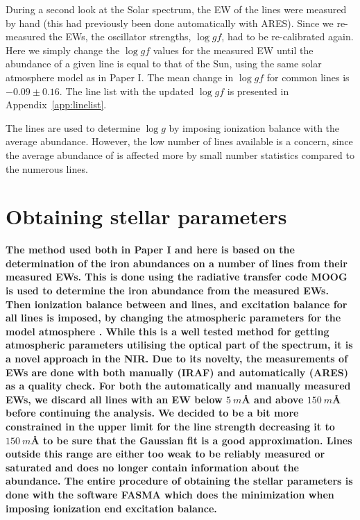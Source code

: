 \documentclass{aa}
\begin{document}
During a second look at the Solar spectrum, the EW of the lines were measured by
hand (this had previously been done automatically with ARES). Since we
re-measured the EWs, the oscillator strengths, $\log \mathit{gf}$, had to be
re-calibrated again. Here we simply change the $\log \mathit{gf}$ values for the
measured EW until the abundance of a given line is equal to that of the Sun,
using the same solar atmosphere model as in Paper I. The mean change in $\log
\mathit{gf}$ for common lines is $-0.09 \pm 0.16$. The line list with the
updated $\log \mathit{gf}$ is presented in Appendix~\ref{app:linelist}.

The  lines are used to determine $\log g$ by imposing ionization
balance with the average  abundance. However, the low number of
 lines available is a concern, since the average abundance of
 is affected more by small number statistics compared to the
numerous  lines.


\section{Obtaining stellar parameters}
\label{sec:method}

{\bf The method used both in Paper I and here is based on the determination of
the iron abundances on a number of lines from their measured EWs. This is done
using the radiative transfer code MOOG \citep{Sneden1973} is used to determine
the iron abundance from the measured EWs. Then ionization balance between
 and  lines, and excitation balance for all 
lines is imposed, by changing the atmospheric parameters for the model
atmosphere \citep[][is used here]{Kurucz1993}. While this is a well tested
method for getting atmospheric parameters utilising the optical part of the
spectrum, it is a novel approach in the NIR. Due to its novelty, the
measurements of EWs are done with both manually (IRAF) and automatically (ARES)
as a quality check. For both the automatically and manually measured EWs, we
discard all lines with an EW below $\SI{5}{m}$\AA{} and above $\SI{150}{m}$\AA{}
before continuing the analysis. We decided to be a bit more constrained in the
upper limit for the line strength decreasing it to $\SI{150}{m}$\AA{} to be sure
that the Gaussian fit is a good approximation. Lines outside this range are
either too weak to be reliably measured or saturated and does no longer contain
information about the abundance. The entire procedure of obtaining the stellar
parameters is done with the software FASMA \citep{Andreasen2017a} which does the
minimization when imposing ionization end excitation balance.}
\end{document}
